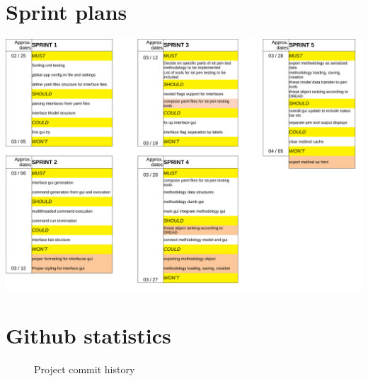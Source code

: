 \documentclass{article}
\begin{document}
\section{Sprint plans}\label{sec:appendix-sprint-plans}
\begin{center}
	\begin{sideways}%
		\begin{minipage}{0.92\textheight}
			\includegraphics[width=\linewidth,keepaspectratio]
			{sprint_planning.pdf}
			\label{fig:xx}
		\end{minipage}
	\end{sideways}
\end{center}


\section{Github statistics}\label{sec:appendix-github}
\begin{figure}[!htb]
	\caption{Project commit history}
\end{figure}
\end{document}
